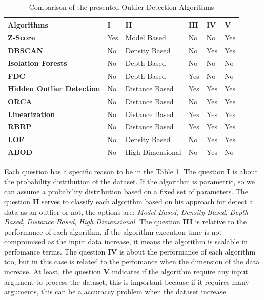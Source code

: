 \begin{table}[]
	\centering
	\begin{tabular}{|l|l|l|l|l|l|}
		\hline
		\textbf{Algorithms}               & \textbf{I} & \textbf{II}      & \textbf{III} & \textbf{IV} & \textbf{V} \\ \hline
		\textbf{Z-Score}                  & Yes        & Model Based      & No           & No          & Yes        \\ \hline
		\textbf{DBSCAN}                   & No         & Density Based    & No           & Yes         & Yes        \\ \hline
		\textbf{Isolation Forests}        & No         & Depth Based      & No           & No          & No         \\ \hline
		\textbf{FDC}                      & No         & Depth Based      & Yes          & No          & No         \\ \hline
		\textbf{Hidden Outlier Detection} & No         & Distance Based   & Yes          & Yes         & Yes        \\ \hline
		\textbf{ORCA}                     & No         & Distance Based   & No           & Yes         & Yes        \\ \hline
		\textbf{Linearization}            & No         & Distance Based   & Yes          & Yes         & Yes        \\ \hline
		\textbf{RBRP}                     & No         & Distance Based   & Yes          & Yes         & Yes        \\ \hline
		\textbf{LOF}                      & No         & Density Based    & No           & Yes         & Yes        \\ \hline
		\textbf{ABOD}                     & No         & High Dimensional & No           & Yes         & No         \\ \hline
	\end{tabular}
	\caption{Comparison of the presented Outlier Detection Algorithms}
	\label{table:algorithms-comparison}
\end{table}

Each question has a specific reason to be in the Table \ref{table:algorithms-comparison}. The question \textbf{I} is about the probability distribution of the dataset. If the algorithm is parametric, so we can assume a probability distribution based on a fixed set of parameters. The question \textbf{II} serves to classify each algorithm based on his approach for detect a data as an outlier or not, the options are: \textit{Model Based}, \textit{Density Based}, \textit{Depth Based}, \textit{Distance Based}, \textit{High Dimensional}. The question \textbf{III} is relative to the performance of each algorithm, if the algorithm execution time is not compromised as the input data increase, it means the algorithm is scalable in perfomance terms. The question \textbf{IV} is about the performance of each algorithm too, but in this case is related to the perfomance when the dimension of the data increase. At least, the question \textbf{V} indicates if the algorithm require any input argument to process the dataset, this is important because if it requires many arguments, this can be a accuraccy problem when the dataset increase.